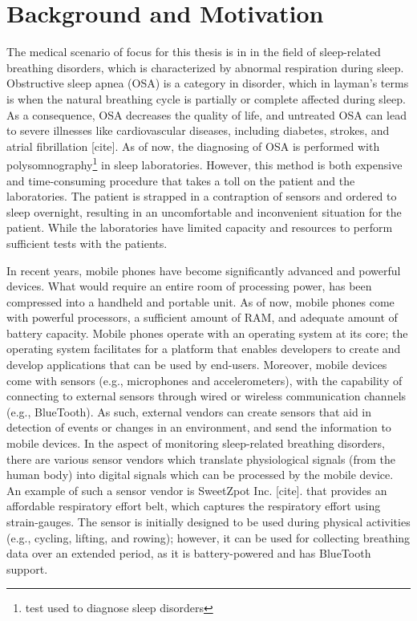 \section{Background and Motivation}

The medical scenario of focus for this thesis is in in the field of sleep-related breathing disorders, which is characterized by abnormal respiration during sleep. Obstructive sleep apnea (OSA) is a category in disorder, which in layman's terms is when the natural breathing cycle is partially or complete affected during sleep. As a consequence, OSA decreases the quality of life, and untreated OSA can lead to severe illnesses like cardiovascular diseases, including diabetes, strokes, and atrial fibrillation [cite]. As of now, the diagnosing of OSA is performed with polysomnography\footnote{test used to diagnose sleep disorders} in sleep laboratories. However, this method is both expensive and time-consuming procedure that takes a toll on the patient and the laboratories. The patient is strapped in a contraption of sensors and ordered to sleep overnight, resulting in an uncomfortable and inconvenient situation for the patient. While the laboratories have limited capacity and resources to perform sufficient tests with the patients.

In recent years, mobile phones have become significantly advanced and powerful devices. What would require an entire room of processing power, has been compressed into a handheld and portable unit. As of now, mobile phones come with powerful processors, a sufficient amount of RAM, and adequate amount of battery capacity. Mobile phones operate with an operating system at its core; the operating system facilitates for a platform that enables developers to create and develop applications that can be used by end-users. Moreover, mobile devices come with sensors (e.g., microphones and accelerometers), with the capability of connecting to external sensors through wired or wireless communication channels (e.g., BlueTooth). As such, external vendors can create sensors that aid in detection of events or changes in an environment, and send the information to mobile devices. In the aspect of monitoring sleep-related breathing disorders, there are various sensor vendors which translate physiological signals (from the human body) into digital signals which can be processed by the mobile device. An example of such a sensor vendor is SweetZpot Inc. [cite]. that provides an affordable respiratory effort belt, which captures the respiratory effort using strain-gauges. The sensor is initially designed to be used during physical activities (e.g., cycling, lifting, and rowing); however, it can be used for collecting breathing data over an extended period, as it is battery-powered and has BlueTooth support.


